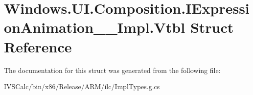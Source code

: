 \hypertarget{struct_windows_1_1_u_i_1_1_composition_1_1_i_expression_animation_____impl_1_1_vtbl}{}\section{Windows.\+U\+I.\+Composition.\+I\+Expression\+Animation\+\_\+\+\_\+\+Impl.\+Vtbl Struct Reference}
\label{struct_windows_1_1_u_i_1_1_composition_1_1_i_expression_animation_____impl_1_1_vtbl}


The documentation for this struct was generated from the following file\+:\begin{DoxyCompactItemize}
\item 
I\+V\+S\+Calc/bin/x86/\+Release/\+A\+R\+M/ilc/Impl\+Types.\+g.\+cs\end{DoxyCompactItemize}
